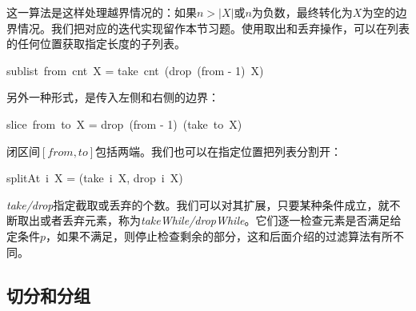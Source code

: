 \documentclass[b5paper]{ctexart}
\begin{document}
这一算法是这样处理越界情况的：如果$n > |X|$或$n$为负数，最终转化为$X$为空的边界情况。我们把对应的迭代实现留作本节习题。使用取出和丢弃操作，可以在列表的任何位置获取指定长度的子列表。

\be
sublist\ from\ cnt\ X = take\ cnt\ (drop\ (from - 1)\ X)
\ee

另外一种形式，是传入左侧和右侧的边界：

\be
slice\ from\ to\ X = drop\ (from - 1)\ (take\ to\ X)
\ee

闭区间$[from, to]$包括两端。我们也可以在指定位置把列表分割开：

\be
splitAt\ i\ X = (take\ i\ X, drop\ i\ X)
\label{eq:split-at}
\ee

 
\textit{take/drop}指定截取或丢弃的个数。我们可以对其扩展，只要某种条件成立，就不断取出或者丢弃元素，称为\textit{takeWhile/dropWhile}。它们逐一检查元素是否满足给定条件$p$，如果不满足，则停止检查剩余的部分，这和后面介绍的过滤算法有所不同。

\be
{}
\ee

\begin{Exercise}
\end{Exercise}

\subsection{切分和分组}
  
\end{document}

